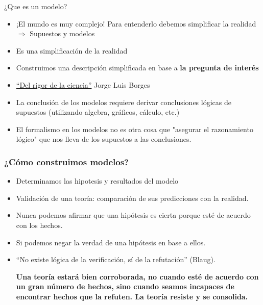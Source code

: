 \documentclass{beamer}
\begin{document}
\begin{frame}{¿Que es un modelo?}
\begin{itemize}
    \item ¡El mundo es muy complejo! Para entenderlo debemos simplificar la realidad \vspace{2mm} \\ $\Rightarrow$
    Supuestos y modelos \vspace{2mm}
    \item Es una simplificación de la realidad \vspace{2mm}
    \item Construimos una descripción simplificada en base a \textbf{la pregunta de interés} 
    \item  \href{https://www.youtube.com/watch?v=zwDA3GmcwJU}{``Del rigor de la ciencia''} 
    Jorge Luis Borges
    \item La conclusión de los modelos requiere derivar conclusiones lógicas de supuestos (utilizando algebra, gráficos, cálculo, etc.)
    \item El formalismo en los modelos no es otra cosa que "asegurar el razonamiento lógico" que nos lleva de los supuestos a las conclusiones.
\end{itemize}
\end{frame}

\begin{frame}
\frametitle{¿Cómo construimos modelos?}
    \begin{itemize}
        \item Determinamos las hipotesis y resultados del modelo 
        \item Validación de una teoría: comparación de sus predicciones con la realidad.
        \item Nunca podemos afirmar que una hipótesis es cierta porque esté de acuerdo con los hechos.
        \item Si podemos negar la verdad de una hipótesis en base a ellos.
        \item “No existe lógica de la verificación, sí de la refutación” (Blaug).
        \begin{center}
            \begin{boxA}
                \textbf{Una teoría estará bien corroborada, no cuando esté de acuerdo con un gran número de hechos, sino cuando seamos incapaces de encontrar hechos que la refuten. La teoría resiste y se consolida.}
            \end{boxA}
        \end{center}
    \end{itemize}
\end{frame}
\end{document}
